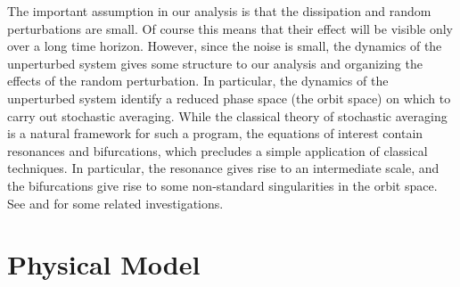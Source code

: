 The important assumption in our analysis is that the dissipation and random perturbations are small. Of course this means that their effect will be visible only over a long time horizon. However, since the noise is small, the dynamics of the unperturbed system gives some structure to our analysis and organizing the effects of the random perturbation. In particular, the dynamics of the unperturbed system identify a reduced phase space (the orbit space) on which to carry out stochastic averaging. While the classical theory of stochastic averaging is a natural framework for such a program, the equations of interest contain resonances and bifurcations, which precludes a simple application of classical techniques. In particular, the resonance gives rise to an intermediate scale, and the bifurcations give rise to some non-standard singularities in the orbit space. See \citet{freidlin94:_random_pertur_of_hamil_system,freidlin98:_random_pertur_nonlin_oscil,namachchivaya01:_non_duffin_pol} and \citet{sowers02:_stoch_averag_with_flatt_hamil} for some related investigations.

\section{Physical Model}
\label{S:model}

